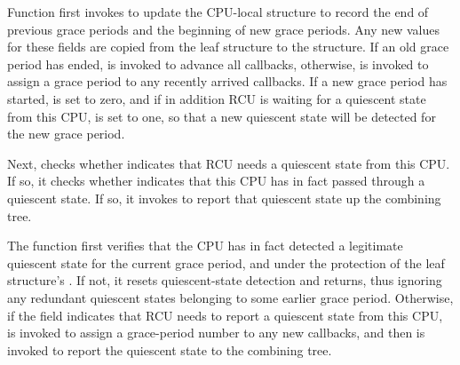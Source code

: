 Function  first invokes  
to update the CPU-local  structure to record the end of 
previous grace periods and the beginning of new grace periods.
Any new values for these fields are copied from the leaf 
structure to the  structure.
If an old grace period has ended,  is invoked to
advance all callbacks, otherwise,  is invoked
to assign a grace period to any recently arrived callbacks.
If a new grace period has started,  is set to zero,
and if in addition RCU is waiting for a quiescent state from this CPU,
 is set to one, so that a new quiescent state will
be detected for the new grace period.
%

Next,
 checks whether  indicates
that RCU needs a quiescent state from this CPU.
If so, it checks whether  indicates that this
CPU has in fact passed through a quiescent state.
If so, it invokes  to report that quiescent
state up the %
combining tree.

The  function first verifies that the CPU has
in fact detected a legitimate quiescent state for the current grace period,
and under the protection of the leaf  structure's .
If not, it resets quiescent-state detection and returns, thus ignoring
any redundant quiescent states belonging to some earlier grace period.
Otherwise, if the  field indicates that RCU needs to report a 
quiescent state from this CPU,  is invoked to assign 
a grace-period number to any new callbacks, and then  
is invoked to report the quiescent state to the  combining tree.


